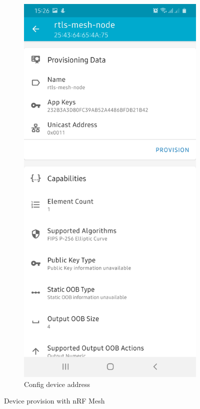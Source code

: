 \documentclass[\main/main.tex]{subfiles}
\begin{document}
\begin{figure}[H]
    \begin{subfigure}[b]{0.4\linewidth}
        \centering
        \includegraphics[width=0.9\linewidth]{nRF_Mesh_01.jpg}
        \caption{Config device address}
    \end{subfigure}
    \caption{Device provision with nRF Mesh}
    \label{fig:device_provision_with_nrf_mesh_00}
\end{figure}
\end{document}
